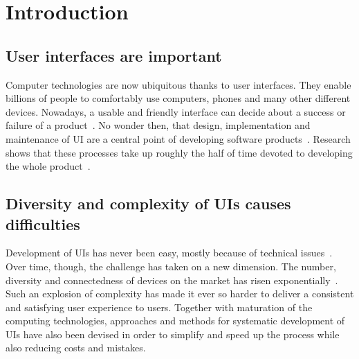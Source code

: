 \section{Introduction}\label{sec:introduction}

\subsection{User interfaces are important}\label{subsec:user-interfaces-are-important}
Computer technologies are now ubiquitous thanks to user interfaces.
They enable billions of people to comfortably use computers, phones and many other different devices.
Nowadays, a usable and friendly interface can decide about a success or failure of a product~\cite{Offutt2002}.
No wonder then, that design, implementation and maintenance of UI are a central point of developing software products~\cite{Anderson2010}.
Research shows that these processes take up roughly the half of time devoted to developing the whole product~\cite{Myers1992}.

\subsection{Diversity and complexity of UIs causes difficulties}\label{subsec:diversity-and-complexity-of-uis-causes-difficulties}
Development of UIs has never been easy, mostly because of technical issues~\cite{Six1991}.
Over time, though, the challenge has taken on a new dimension.
The number, diversity and connectedness of devices on the market has risen exponentially~\cite{Cisco2020}.
Such an explosion of complexity has made it ever so harder to deliver a consistent and satisfying user experience to users.
Together with maturation of the computing technologies, approaches and methods for systematic development of UIs have also been devised in order to simplify and speed up the process while also reducing costs and mistakes.

